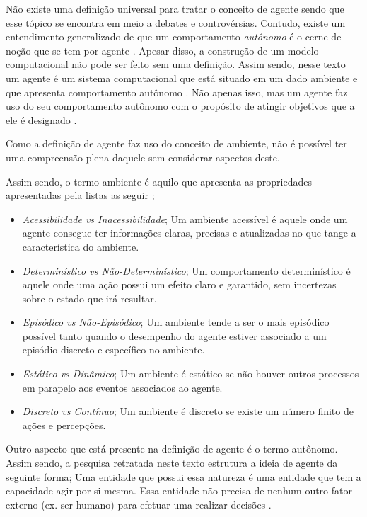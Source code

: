Não existe uma definição universal para tratar o conceito de agente sendo que esse tópico se encontra em meio a debates e controvérsias. Contudo, existe um entendimento generalizado de que um comportamento \textit{autônomo} é o cerne de noção que se tem por agente \cite{whatisagent}. Apesar disso, a construção de um modelo computacional não pode ser feito sem uma definição. Assim sendo, nesse texto um agente é um sistema computacional que está situado em um dado ambiente e que apresenta comportamento autônomo \cite{whatisagent} \cite{whatisagent}. Não apenas isso, mas um agente faz uso do seu comportamento autônomo com o propósito de atingir objetivos que a ele é designado \cite{whatisagent}.

Como a definição de agente faz uso do conceito de ambiente, não é possível ter uma compreensão plena daquele sem considerar aspectos deste.  

Assim sendo, o termo ambiente  é aquilo que apresenta as propriedades apresentadas pela listas as seguir \cite{artificialinteligencemodermapproach} \cite{whatisagent}; 
\begin{itemize}
    \item \textit{Acessibilidade vs Inacessibilidade}; Um ambiente acessível é aquele onde um agente consegue ter informações claras, precisas e atualizadas no que tange a característica do ambiente.
    \item \textit{Determinístico vs Não-Determinístico}; Um comportamento determinístico é aquele onde uma ação possui um efeito claro e garantido, sem incertezas sobre o estado que irá resultar.
    \item \textit{Episódico vs Não-Episódico}; Um ambiente tende a ser o mais episódico possível tanto quando o desempenho do agente estiver associado a um episódio discreto e específico no ambiente.
    \item \textit{Estático vs Dinâmico}; Um ambiente é estático se não houver outros processos em parapelo aos eventos associados ao agente.
    \item \textit{Discreto vs Contínuo}; Um ambiente é discreto se existe um número finito de ações e percepções. 
\end{itemize}

Outro aspecto que está presente na definição de agente é o termo autônomo. Assim sendo, a pesquisa retratada neste texto estrutura a ideia de agente da seguinte forma; Uma entidade que possui essa natureza é uma entidade que tem a capacidade agir por si mesma. Essa entidade não precisa de nenhum outro fator externo (ex. ser humano) para efetuar uma realizar decisões \cite{whatisagent}.

